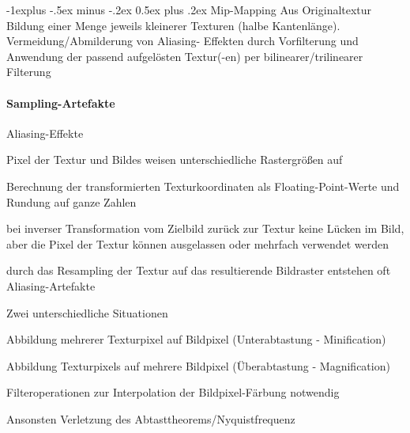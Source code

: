 \documentclass[landscape]{article}
\makeatletter
\renewcommand{\subsection}{\@startsection{subsection}{2}{0mm}%
                                {-1explus -.5ex minus -.2ex}%
                                {0.5ex plus .2ex}%
                                {\normalfont\normalsize\bfseries}}
\makeatother
\begin{document}
\begin{multicols}{3}
  \subsection{Mip-Mapping}
  Aus Originaltextur Bildung einer Menge jeweils kleinerer Texturen (halbe Kantenlänge).  
  Vermeidung/Abmilderung von Aliasing- Effekten durch Vorfilterung und Anwendung der passend aufgelösten Textur(-en) per bilinearer/trilinearer Filterung
  
  \paragraph{Sampling-Artefakte}
  Aliasing-Effekte
  \begin{itemize*}
    \item Pixel der Textur und Bildes weisen unterschiedliche Rastergrößen auf
    \item Berechnung der transformierten Texturkoordinaten als Floating-Point-Werte und Rundung auf ganze Zahlen
    \item bei inverser Transformation vom Zielbild zurück zur Textur keine Lücken im Bild, aber die Pixel der Textur können ausgelassen oder mehrfach verwendet werden
    \item durch das Resampling der Textur auf das resultierende Bildraster entstehen oft Aliasing-Artefakte
  \end{itemize*}
  
  Zwei unterschiedliche Situationen
  \begin{itemize*}
    \item Abbildung mehrerer Texturpixel auf Bildpixel (Unterabtastung - Minification)
    \item Abbildung Texturpixels auf mehrere Bildpixel (Überabtastung - Magnification)
    \item Filteroperationen zur Interpolation der Bildpixel-Färbung notwendig
    \item Ansonsten Verletzung des Abtasttheorems/Nyquistfrequenz
  \end{itemize*}  
  

\end{multicols}
\end{document}
